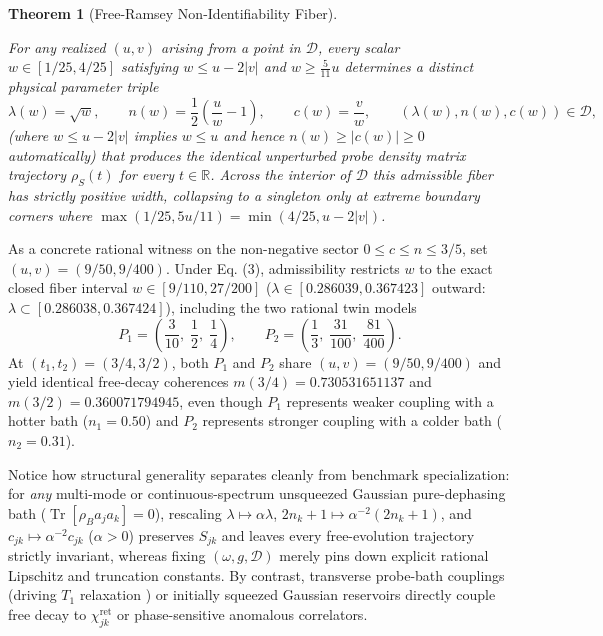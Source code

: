 \documentclass[11pt,letterpaper]{article}
\newtheorem{theorem}{Theorem}
\theoremstyle{definition}
\begin{document}
\begin{theorem}[Free-Ramsey Non-Identifiability Fiber]\label{thm-ramsey}

For any realized \((u, v)\) arising from a point in \(\mathcal{D}\),
every scalar \(w \in [1/25, 4/25]\) satisfying \(w \le u - 2|v|\) and
\(w \ge \frac{5}{11} u\) determines a distinct physical parameter triple
\[\lambda(w) = \sqrt{w}, \qquad n(w) = \frac{1}{2}\left(\frac{u}{w} - 1\right), \qquad c(w) = \frac{v}{w}, \qquad (\lambda(w), n(w), c(w)) \in \mathcal{D},
\tag{11}\] (where \(w \le u - 2|v|\) implies \(w \le u\) and hence
\(n(w) \ge |c(w)| \ge 0\) automatically) that produces the identical
unperturbed probe density matrix trajectory \(\rho_S(t)\) for every
\(t \in \mathbb{R}\). Across the interior of \(\mathcal{D}\) this
admissible fiber has strictly positive width, collapsing to a singleton
only at extreme boundary corners where
\(\max(1/25, 5u/11) = \min(4/25, u - 2|v|)\).

\end{theorem}

As a concrete rational witness on the non-negative sector
\(0 \le c \le n \le 3/5\), set \((u, v) = (9/50, 9/400)\). Under Eq.
(3), admissibility restricts \(w\) to the exact closed fiber interval
\(w \in [9/110, 27/200]\) (\(\lambda \in [0.286039, 0.367423]\) outward:
\(\lambda \subset [0.286038, 0.367424]\)), including the two rational
twin models
\[P_1 = \left(\frac{3}{10},\; \frac{1}{2},\; \frac{1}{4}\right), \qquad P_2 = \left(\frac{1}{3},\; \frac{31}{100},\; \frac{81}{400}\right).
\tag{12}\] At \((t_1, t_2) = (3/4, 3/2)\), both \(P_1\) and \(P_2\)
share \((u, v) = (9/50, 9/400)\) and yield identical free-decay
coherences \(m(3/4) = 0.730531651137\) and \(m(3/2) = 0.360071794945\),
even though \(P_1\) represents weaker coupling with a hotter bath
(\(n_1 = 0.50\)) and \(P_2\) represents stronger coupling with a colder
bath (\(n_2 = 0.31\)).

Notice how structural generality separates cleanly from benchmark
specialization: for \emph{any} multi-mode or continuous-spectrum
unsqueezed Gaussian pure-dephasing bath
(\(\operatorname{Tr}[\rho_B a_j a_k] = 0\)), rescaling
\(\lambda \mapsto \alpha \lambda\),
\(2n_k + 1 \mapsto \alpha^{-2}(2n_k + 1)\), and
\(c_{jk} \mapsto \alpha^{-2} c_{jk}\) (\(\alpha > 0\)) preserves
\(S_{jk}\) and leaves every free-evolution trajectory strictly
invariant, whereas fixing \((\omega, g, \mathcal{D})\) merely pins down
explicit rational Lipschitz and truncation constants. By contrast,
transverse probe-bath couplings (driving \(T_1\) relaxation
\citep{pazSilva2019}) or initially squeezed Gaussian reservoirs directly
couple free decay to \(\chi^{\mathrm{ret}}_{jk}\) or phase-sensitive
anomalous correlators.
\end{document}
